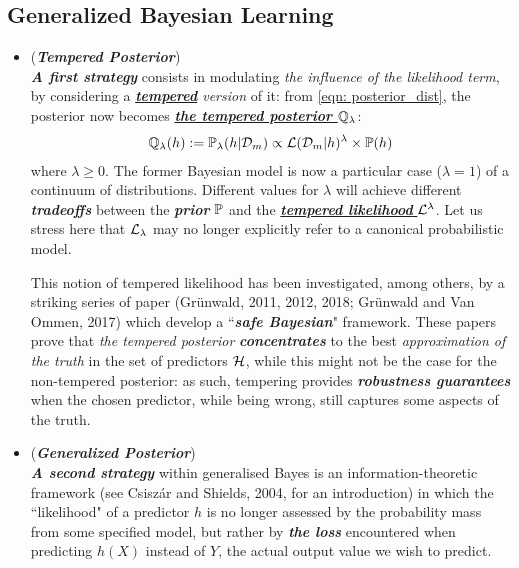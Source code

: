 \documentclass[11pt]{article}
\begin{document}
\subsection{Generalized Bayesian Learning}
\begin{itemize}
\item \begin{remark}(\textbf{\emph{Tempered Posterior}}) \citep{guedj2019primer}\\
\emph{\textbf{A first strategy}} consists in modulating \emph{the influence of the likelihood term}, by considering a \emph{\underline{\textbf{tempered}} version} of it: from \eqref{eqn: posterior_dist}, the posterior now becomes \emph{\underline{\textbf{the tempered posterior ${\mathbb Q}_{\lambda}$}}}:
\begin{align}
{\mathbb Q}_{\lambda}(h) := {\mathbb P}_{\lambda}(h | {\mathcal D}_m) \propto {\mathcal L}({\mathcal D}_m | h)^{\lambda} \times {\mathbb P}(h) \label{eqn: tempered_posterior_dist}
\end{align} where $\lambda \ge 0$. The former Bayesian model is now a particular case ($\lambda = 1$) of a continuum of distributions. Different values for $\lambda$ will achieve different \emph{\textbf{tradeoffs}} between the \emph{\textbf{prior}} ${\mathbb P}$ and the \underline{\emph{\textbf{tempered likelihood}} ${\mathcal L}^{\lambda}$}. Let us stress here that ${\mathcal L}_{\lambda}$ may no longer explicitly refer to a canonical probabilistic model.

This notion of tempered likelihood has been investigated, among others, by a striking series of paper (Grünwald, 2011, 2012, 2018; Grünwald and Van Ommen, 2017)
which develop a ``\emph{\textbf{safe Bayesian}}" framework. These papers prove that \emph{the tempered posterior} \emph{\textbf{concentrates}} to the best \emph{approximation of the truth} in the set of predictors ${\mathcal H}$, while this might not be the case for the non-tempered posterior: as such, tempering provides \emph{\textbf{robustness guarantees}} when the chosen predictor, while being wrong, still captures some aspects of the truth.
\end{remark}

\item \begin{remark}(\textbf{\emph{Generalized Posterior}}) \citep{guedj2019primer}\\
\emph{\textbf{A second strategy}} within generalised Bayes is an information-theoretic framework (see Csiszár and Shields, 2004, for an introduction) in which the ``likelihood" of a predictor $h$ is no longer assessed by the probability mass from some specified model, but rather by \emph{\textbf{the loss}} encountered when
predicting $h(X)$ instead of $Y$, the actual output value we wish to predict.


\end{remark}
\end{itemize}
\end{document}
